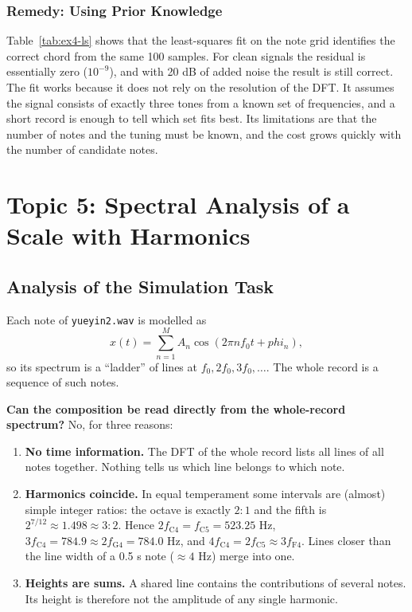 \documentclass[12pt, a4paper]{article}
\def\varphi{phi }%
\begin{document}
\subsubsection{Remedy: Using Prior Knowledge}
Table~\ref{tab:ex4-ls} shows that the least-squares fit on the note grid identifies the correct chord from the same 100 samples. For clean signals the residual is essentially zero ($10^{-9}$), and with 20 dB of added noise the result is still correct. The fit works because it does not rely on the resolution of the DFT. It assumes the signal consists of exactly three tones from a known set of frequencies, and a short record is enough to tell which set fits best. Its limitations are that the number of notes and the tuning must be known, and the cost grows quickly with the number of candidate notes.

\section{Topic 5: Spectral Analysis of a Scale with Harmonics}

\subsection{Analysis of the Simulation Task}

Each note of \texttt{yueyin2.wav} is modelled as
\begin{equation}
    x(t)=\sum_{n=1}^{M}A_n\cos(2\pi nf_0t+\varphi_n),
\end{equation}
so its spectrum is a ``ladder'' of lines at $f_0,2f_0,3f_0,\dots$. The whole record is a sequence of such notes.

\textbf{Can the composition be read directly from the whole-record spectrum?} No, for three reasons:
\begin{enumerate}
    \item \textbf{No time information.} The DFT of the whole record lists all lines of all notes together. Nothing tells us which line belongs to which note.
    \item \textbf{Harmonics coincide.} In equal temperament some intervals are (almost) simple integer ratios: the octave is exactly $2{:}1$ and the fifth is $2^{7/12}\approx1.498\approx3{:}2$. Hence $2f_{\mathrm{C4}}=f_{\mathrm{C5}}=523.25$ Hz, $3f_{\mathrm{C4}}=784.9\approx2f_{\mathrm{G4}}=784.0$ Hz, and $4f_{\mathrm{C4}}=2f_{\mathrm{C5}}\approx3f_{\mathrm{F4}}$. Lines closer than the line width of a 0.5 s note ($\approx4$ Hz) merge into one.
    \item \textbf{Heights are sums.} A shared line contains the contributions of several notes. Its height is therefore not the amplitude of any single harmonic.
\end{enumerate}
\end{document}
